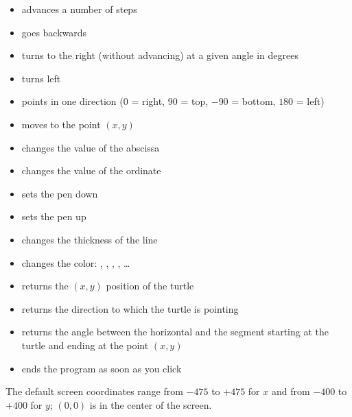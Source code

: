 \documentclass[11pt,class=report,crop=false]{standalone}
\begin{document}
\begin{cours}
\begin{itemize}
  \item {} advances a number of steps
  \item {} goes backwards
  \item {} turns to the right (without advancing) at a given angle in degrees
  \item {} turns left
  \item {} points in one direction ($0$ = right, $90$ = top, $-90$ = bottom, $180$ = left)
  \item {} moves to the point $(x,y)$
  \item {} changes the value of the abscissa
  \item {} changes the value of the ordinate
  
  
  \item {} sets the pen down
  \item {} sets the pen up
  \item {} changes the thickness of the line
  \item {} changes the color: , , , , \ldots
  
  \item {} returns the $(x,y)$ position of the turtle
  \item {} returns the direction  to which the turtle is pointing
  \item {} returns the angle between the horizontal and the segment starting at the turtle and ending at the point $(x,y)$
  \item {} ends the program as soon as you click
\end{itemize}

The default screen coordinates range from $-475$ to $+475$ for $x$ and
from $-400$ to $+400$ for $y$; $(0,0)$ is in the center of the screen.


\end{cours}


\end{document}
